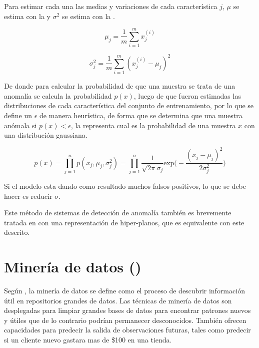 Para estimar cada una las medias y variaciones de cada característica $j$, $\mu$ se estima con la  y $\sigma^2$ se estima con la .

\begin{equation} \label{eq:anomaly-mu}
  \mu_j = \frac{1}{m} \sum_{i=1}^{m} x_j^{(i)}
\end{equation}

\begin{equation} \label{eq:anomaly-sigma}
  \sigma_j^2 = \frac{1}{m} \sum_{i=1}^{m} (x_j^{(i)} - \mu_j)^2
\end{equation}

De donde para calcular la probabilidad de que una muestra se trata de una anomalía se calcula la probabilidad $p(x)$, luego de que fueron estimadas las distribuciones de cada característica del conjunto de entrenamiento, por lo que se define un $\epsilon$ de manera heurística, de forma que se determina que una muestra anómala si $p(x) < \epsilon$, la  representa cual es la probabilidad de una muestra $x$ con una distribución gaussiana.

\begin{equation} \label{eq:anomaly-prob}
  p(x) = \prod_{j=1}^{n}p(x_j, \mu_j, \sigma_j^2) = \prod_{j=1}^{n} \frac{1}{\sqrt{2\pi}\sigma_j} \text{exp}\Bigg( - \frac{(x_j-\mu_j)^2}{2\sigma_j^2}\Bigg)
\end{equation}

Si el modelo esta dando como resultado muchos falsos positivos, lo que se debe hacer es reducir $\sigma$.

Este método de sistemas de detección de anomalía también es brevemente tratada en \cite{osint} con una representación de hiper-planos, que es equivalente con este descrito.

\section{Minería de datos ()} \label{sec:datamining}
Según \cite{tan2005introduction}, la minería de datos se define como el proceso de descubrir información útil en repositorios grandes de datos. Las técnicas de minería de datos son desplegadas para limpiar grandes bases de datos para encontrar patrones nuevos y útiles que de lo contrario podrían permanecer desconocidos. También ofrecen capacidades para predecir la salida de observaciones futuras, tales como predecir si un cliente nuevo gastara mas de \$100 en una tienda.


